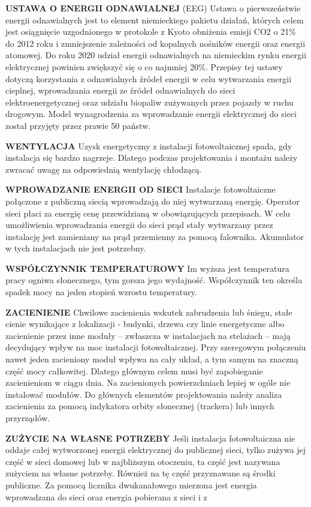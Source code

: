 \documentclass[12pt,a4paper]{article}
\begin{document}
\textbf{USTAWA O ENERGII ODNAWIALNEJ} (EEG)
Ustawa o pierwszeństwie energii odnawialnych jest to element niemieckiego pakietu działań, których celem jest osiągnięcie uzgodnionego w protokole z Kyoto obniżenia emisji CO2 o 21\% do 2012 roku i zmniejszenie zależności od kopalnych nośników energii oraz energii atomowej. Do roku 2020 udział energii odnawialnych na niemieckim rynku energii elektrycznej powinien zwiększyć się o co najmniej 20\%. Przepisy tej ustawy dotyczą korzystania z odnawialnych źródeł energii w celu wytwarzania energii cieplnej, wprowadzania energii ze źródeł odnawialnych do sieci elektroenergetycznej oraz udziału biopaliw zużywanych przez pojazdy w ruchu drogowym. Model wynagrodzenia za wprowadzanie energii elektrycznej do sieci został przyjęty przez prawie 50 państw.


\textbf{WENTYLACJA}
Uzysk energetyczny z instalacji fotowoltaicznej spada, gdy instalacja się bardzo nagrzeje. Dlatego podczas projektowania i montażu należy zwracać uwagę na odpowiednią wentylację chłodzącą.


\textbf{WPROWADZANIE ENERGII OD SIECI}
Instalacje fotowoltaiczne połączone z publiczną siecią wprowadzają do niej wytwarzaną energię. Operator sieci płaci za energię cenę przewidzianą w obowiązujących przepisach. W celu umożliwienia wprowadzania energii do sieci prąd stały wytwarzany przez instalację jest zamieniany na prąd przemienny za pomocą falownika. Akumulator w tych instalacjach nie jest potrzebny.


\textbf{WSPÓŁCZYNNIK TEMPERATUROWY}
Im wyższa jest temperatura pracy ogniwa słonecznego, tym gorsza jego wydajność. Współczynnik ten określa spadek mocy na jeden stopień wzrostu temperatury.


\textbf{ZACIENIENIE}
Chwilowe zacienienia wskutek zabrudzenia lub śniegu, stałe cienie wynikające z lokalizacji - budynki, drzewa czy linie energetyczne albo zacienienie przez inne moduły – zwłaszcza w instalacjach na stelażach – mają decydujący wpływ na moc instalacji fotowoltaicznej. Przy szeregowym połączeniu nawet jeden zacieniony moduł wpływa na cały układ, a tym samym na znaczną część mocy całkowitej. Dlatego głównym celem musi być zapobieganie zacienieniom w ciągu dnia. Na zacienionych powierzchniach lepiej w ogóle nie instalować modułów. Do głównych elementów projektowania należy analiza zacienienia za pomocą indykatora orbity słonecznej (trackera) lub innych przyrządów.


\textbf{ZUŻYCIE NA WŁASNE POTRZEBY}
Jeśli instalacja fotowoltaiczna nie oddaje całej wytworzonej energii elektrycznej do publicznej sieci, tylko zużywa jej część w sieci domowej lub w najbliższym otoczeniu, ta część jest nazywana zużyciem na własne potrzeby. Również na tę część przyznawane są środki publiczne. Za pomocą licznika dwukanałowego mierzona jest energia wprowadzana do sieci oraz energia pobierana z sieci i z



\printindex
\end{document}
